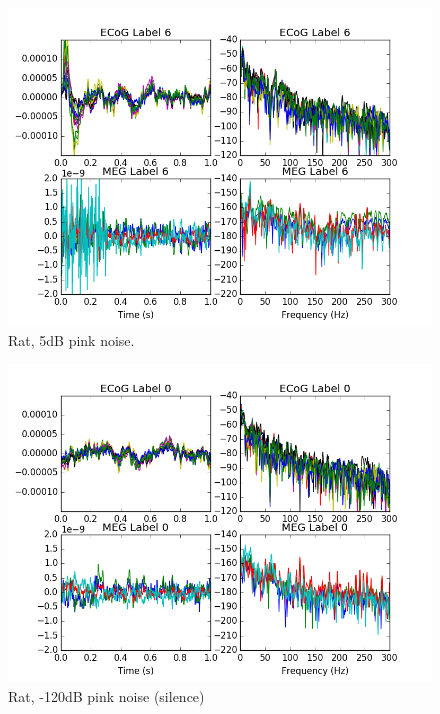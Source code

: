 \documentclass[journal,12pt,onecolumn,draftclsnofoot]{IEEEtran}
\begin{document}
\begin{figure}[h!]
\centering
\includegraphics[width=5in]{finalplots/rat5dbpink}
\caption{Rat, 5dB pink noise.}
\label{fig:rat5dbpink}
\end{figure}

\begin{figure}[h!]
\centering
\includegraphics[width=5in]{finalplots/rat-120dbpink}
\caption{Rat, -120dB pink noise (silence)}
\label{fig:rat-120dbpink}
\end{figure}
\end{document}
